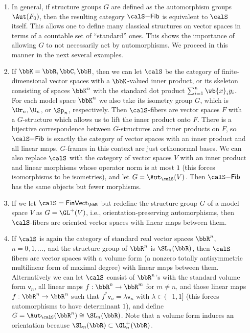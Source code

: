 \begin{example}
\begin{enumerate}
        \item In general, if structure groups $G$ are defined as the automorphism groups $\Aut(F_0)$, then the resulting category $\calS\mathsf{-Fib}$ is equivalent to $\calS$ itself. This allows one to define many classical structures on vector spaces in terms of a countable set of ``standard'' ones. This shows the importance of allowing $G$ to not necessarily act by automorphisms. We proceed in this manner in the next several examples.
        
        \item If $\bbK=\bbR,\bbC,\bbH$, then we can let $\calS$ be the category of finite-dimensional vector spaces with a $\bbK$-valued inner product, or its skeleton consisting of spaces $\bbK^n$ with the standard dot product $\sum_{i=1}^n \wb{x}_i y_i$. For each model space $\bbK^n$ we also take its isometry group $G$, which is $\Or_n,\U_n$, or $\Sp_n$, respectively. Then $\calS$-fibers are vector spaces $F$ with a $G$-structure which allows us to lift the inner product onto $F$. There is a bijective correspondence between $G$-structures and inner products on $F$, so  $\calS\mathsf{-Fib}$ is exactly the category of vector spaces with an inner product and all linear maps. $G$-frames in this context are just orthonormal bases. We can also replace $\calS$ with the category of vector spaces $V$ with an inner product and linear morphisms whose operator norm is at most $1$ (this forces isomorphisms to be isometries), and let $G=\Aut_\calS(V)$. Then $\calS\mathsf{-Fib}$ has the same objects but fewer morphisms.

        \item If we let $\calS=\mathsf{FinVect}_\bbR$ but redefine the structure group $G$ of a model space $V$ as $G=\GL^+(V)$, i.e., orientation-preserving automorphisms, then $\calS$-fibers are oriented vector spaces with linear maps between them. 

        \item If $\calS$ is again the category of standard real vector spaces $\bbR^n$, $n=0,1,\ldots$, and the structure group of $\bbR^n$ is $\SL_n(\bbR)$, then $\calS$-fibers are vector spaces with a volume form (a nonzero totally antisymmetric multilinear form of maximal degree) with linear maps between them. Alternatively we can let $\calS$ consist of $\bbR^n$'s with the standard volume form $\mathsf{v}_n$, all linear maps $f:\bbR^n\to \bbR^m$ for $m\neq n$, and those linear maps $f:\bbR^n\to \bbR^n$ such that $f^\ast \mathsf{v}_n=\lambda \mathsf{v}_n$ with $\lambda\in (-1,1]$ (this forces automorphisms to have determinant $1$), and define $G=\Aut_\calS(\bbR^n)\cong \SL_n(\bbR)$. Note that a volume form induces an orientation because $\SL_n(\bbR)\subset \GL_n^+(\bbR)$.


\end{enumerate}
\end{example}
